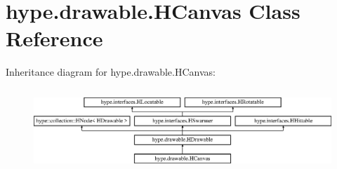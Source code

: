 \hypertarget{classhype_1_1drawable_1_1_h_canvas}{\section{hype.\-drawable.\-H\-Canvas Class Reference}
\label{classhype_1_1drawable_1_1_h_canvas}
}
Inheritance diagram for hype.\-drawable.\-H\-Canvas\-:\begin{figure}[H]
\begin{center}
\leavevmode
\includegraphics[height=3.111111cm]{classhype_1_1drawable_1_1_h_canvas}
\end{center}
\end{figure}
